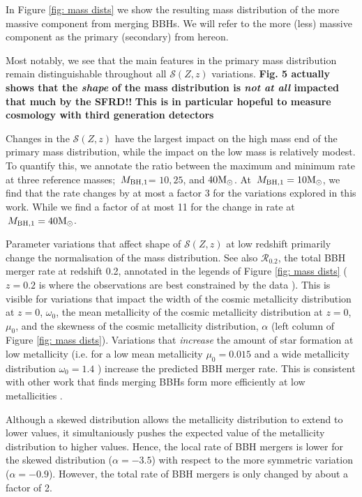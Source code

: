 \documentclass[twocolumn]{aastex631}
\newcommand{\Msun}{\ensuremath{\rm{M}_{\odot}}\xspace}
\newcommand{\Mbheen}{\ensuremath{\,M_{\rm BH, 1}}\xspace}
\newcommand{\SFRDzZ}{\ensuremath{\mathcal{S}(Z,z)}\xspace}
\newcommand{\todo}[1]{{\color{purple}\bf{#1}}}
\begin{document}
In Figure \ref{fig: mass dists} we show the resulting mass distribution of the more massive component from merging BBHs. We will refer to the more (less) massive component as the primary (secondary) from hereon. 

Most notably, we see that the main features in the primary mass distribution remain distinguishable throughout all \SFRDzZ variations. \todo{\cite{chruslinska2022_review} Fig. 5 actually shows that the \textit{shape} of the mass distribution is \textit{not at all} impacted that much by the SFRD!!}
\todo{ This is in particular hopeful to measure cosmology with third generation detectors \cite{MariaEzquiaga2022} } 

Changes in the \SFRDzZ have the largest impact on the high mass end of the primary mass distribution, while the impact on the low mass is relatively modest.
To quantify this, we annotate the ratio between the maximum and minimum rate at three reference masses; \Mbheen = $10, 25$, and $40\Msun$.
At $\Mbheen=10\Msun$, we find that the rate changes by at most a factor 3 for the variations explored in this work. While we find a factor of at most 11 for the change in rate at $\Mbheen=40\Msun$. 


Parameter variations that affect shape of \SFRDzZ at low redshift primarily change the normalisation of the mass distribution. See also  $\mathcal{R}_{0.2}$, the total BBH merger rate at redshift 0.2, annotated in the legends of Figure \ref{fig: mass dists} ($z=0.2$ is where the observations are best constrained by the data \citealt{GWTC3_popPaper2021}). 
This is visible for variations that impact the width of the cosmic metallicity distribution at $z=0$, $\omega_0$, the mean metallicity of the cosmic metallicity distribution at $z=0$, $\mu_0$, and the skewness of the cosmic metallicity distribution, $\alpha$ (left column of Figure \ref{fig: mass dists}).
Variations that \textit{increase} the amount of star formation at low metallicity (i.e. for a low mean metallicity $\mu_0=0.015$ and a wide metallicity distribution $\omega_0 = 1.4$ ) increase the predicted BBH merger rate. This is consistent with other work that finds merging BBHs form more efficiently at low metallicities \citep[e.g.][]{BelczynskiVink2010, Stevenson+2017,Mapelli2017,Chruslinska2019_effectCO,Broekgaarden+2021b}.

Although a skewed distribution allows the metallicity distribution to extend to lower values, it simultaniously pushes the expected value of the metallicity distribution to higher values. Hence, the local rate of BBH mergers is lower for the skewed distribution ($\alpha = -3.5$) with respect to the more symmetric variation ($\alpha = -0.9$). However, the total rate of BBH mergers is only changed by about a factor of 2. 
\end{document}
